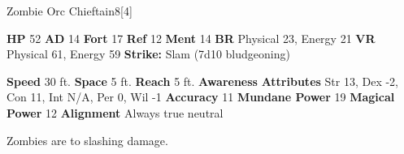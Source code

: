   \begin{monsubsection}{Zombie Orc Chieftain}{8}[4]
    \vspace{-1em}\vspace{-1em}
    \vspace{0em}

    
    

    \begin{spellcontent}
      \begin{spelltargetinginfo}
        \pari \textbf{HP} 52 \monsep
          \textbf{AD} 14 \monsep
          \textbf{Fort} 17 \monsep
          \textbf{Ref} 12 \monsep
          \textbf{Ment} 14
        \pari \textbf{BR} Physical 23, Energy 21 \monsep
        \textbf{VR} Physical 61, Energy 59
        \pari \textbf{Strike:}
            Slam  (7d10 bludgeoning)
      \end{spelltargetinginfo}
    \end{spellcontent}
    \begin{monsterfooter}
      \pari \textbf{Speed} 30 ft. \monsep
        \textbf{Space} 5 ft. \monsep
        \textbf{Reach} 5 ft.
      \pari \textbf{Awareness} 
      \pari \textbf{Attributes}
        Str 13, Dex -2,
        Con 11, Int N/A,
        Per 0, Wil -1
      \pari \textbf{Accuracy} 11 \monsep
        \textbf{Mundane Power} 19 \monsep
      \textbf{Magical Power} 12
      \pari \textbf{Alignment} Always true neutral
    \end{monsterfooter}
  \end{monsubsection}
          Zombies are  to slashing damage.
  
  